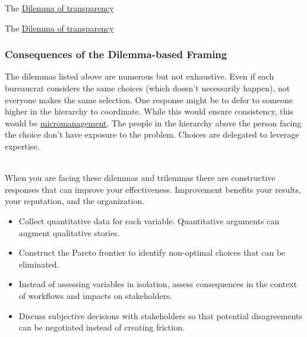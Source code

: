 The \href{table:dilemma-transparency}{Dilemma of transparency}

The \href{table:dilemma-transparency}{Dilemma of transparency}



\subsubsection{Consequences of the Dilemma-based Framing}

The dilemmas listed above are numerous but not exhaustive. Even if each bureaucrat considers the same choices (which doesn't necessarily happen), not everyone makes the same selection. One response might be to defer to someone higher in the hierarchy to coordinate. While this would ensure consistency, this would be \href{https://en.wikipedia.org/wiki/Micromanagement}{micromanagement}. The people in the hierarchy above the person facing the choice don't have exposure to the problem. Choices are delegated to leverage expertise. 

\ \\

When you are facing these dilemmas and trilemmas there are constructive responses that can improve your effectiveness. Improvement benefits your results, your reputation, and the organization. 
\begin{itemize}
    \item Collect quantitative data for each variable. Quantitative arguments can augment qualitative stories. 
    \item Construct the Pareto frontier to identify non-optimal choices that can be eliminated.
    \item Instead of assessing variables in isolation, assess consequences in the context of workflows and impacts on stakeholders.
    \item Discuss subjective decisions with stakeholders so that potential disagreements can be negotiated instead of creating friction.
\end{itemize}
 

